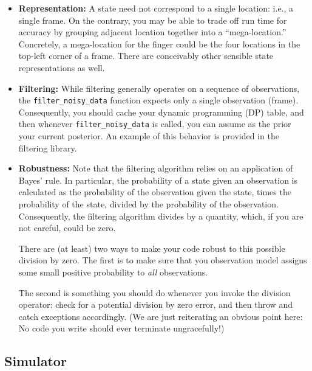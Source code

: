 \documentclass{article}
\begin{document}
\begin{itemize}
\item
\textbf{Representation:} A state need not correspond to a single
location: i.e., a single frame.  On the contrary, you may be able to
trade off run time for accuracy by grouping adjacent location together
into a ``mega-location.''  Concretely, a mega-location for the finger
could be the four locations in the top-left corner of a frame.  There
are conceivably other sensible state representations as well.

\item
\textbf{Filtering:}
While filtering generally operates on a sequence of observations, the
\texttt{filter\_noisy\_data} function expects only a single
observation (frame).  Consequently, you should cache your dynamic
programming (DP) table, and then whenever \texttt{filter\_noisy\_data}
is called, you can assume as the prior your current posterior.  An
example of this behavior is provided in the filtering library.

\item
\textbf{Robustness:} Note that the filtering algorithm relies on an
application of Bayes' rule.  In particular, the probability of a state
given an observation is calculated as the probability of the
observation given the state, times the probability of the state,
divided by the probability of the observation.  Consequently, the
filtering algorithm divides by a quantity, which, if you are not
careful, could be zero.

There are (at least) two ways to make your code robust to this
possible division by zero.  The first is to make sure that you
observation model assigns some small positive probability to
\emph{all\/} observations.

The second is something you should do whenever you invoke the division
operator: check for a potential division by zero error, and then throw
and catch exceptions accordingly.  (We are just reiterating an obvious
point here: No code you write should ever terminate ungracefully!)
\end{itemize}


\subsection{Simulator}
\label{sec:sim}
\end{document}

